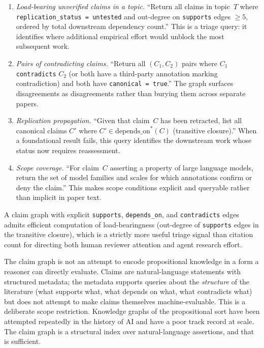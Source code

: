 \documentclass[11pt]{rrvix}
\begin{document}
\begin{enumerate}[leftmargin=2em, itemsep=0.3em]

\item \emph{Load-bearing unverified claims in a topic.} ``Return all claims in topic~$T$ where \texttt{replication\_status = untested} and out-degree on \texttt{supports} edges $\geq 5$, ordered by total downstream dependency count.'' This is a triage query: it identifies where additional empirical effort would unblock the most subsequent work.

\item \emph{Pairs of contradicting claims.} ``Return all $(C_1, C_2)$ pairs where $C_1$ \texttt{contradicts} $C_2$ (or both have a third-party annotation marking contradiction) and both have \texttt{canonical = true}.'' The graph surfaces disagreements as disagreements rather than burying them across separate papers.

\item \emph{Replication propagation.} ``Given that claim~$C$ has been retracted, list all canonical claims $C'$ where $C' \in \mathrm{depends\_on}^*(C)$ (transitive closure).'' When a foundational result fails, this query identifies the downstream work whose status now requires reassessment.

\item \emph{Scope coverage.} ``For claim~$C$ asserting a property of large language models, return the set of model families and scales for which annotations confirm or deny the claim.'' This makes scope conditions explicit and queryable rather than implicit in paper text.

\end{enumerate}

\begin{claim}
\label{claim:queryability}
A claim graph with explicit \texttt{supports}, \texttt{depends\_on}, and \texttt{contradicts} edges admits efficient computation of load-bearingness (out-degree of \texttt{supports} edges in the transitive closure), which is a strictly more useful triage signal than citation count for directing both human reviewer attention and agent research effort.
\end{claim}

\begin{rrvixremark}
The claim graph is not an attempt to encode propositional knowledge in a form a reasoner can directly evaluate. Claims are natural-language statements with structured metadata; the metadata supports queries about the \emph{structure} of the literature (what supports what, what depends on what, what contradicts what) but does not attempt to make claims themselves machine-evaluable. This is a deliberate scope restriction. Knowledge graphs of the propositional sort have been attempted repeatedly in the history of AI and have a poor track record at scale. The claim graph is a structural index over natural-language assertions, and that is sufficient.
\end{rrvixremark}
\end{document}
